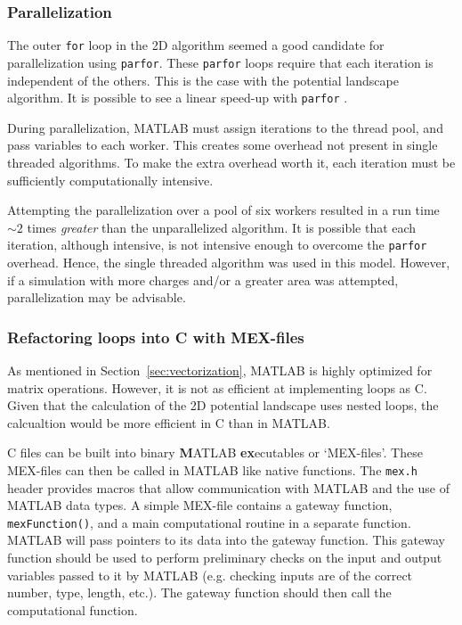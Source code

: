 \message{ !name(report.tex)}\documentclass[]{article}
\begin{document}
\subsubsection{Parallelization}
The outer \texttt{for} loop in the 2D algorithm seemed a good candidate for parallelization using \texttt{parfor}. These \texttt{parfor} loops require that each iteration is independent of the others. This is the case with the potential landscape algorithm. It is possible to see a linear speed-up with \texttt{parfor} \cite{}. 

During parallelization, MATLAB must assign iterations to the thread pool, and pass variables to each worker. This creates some overhead not present in single threaded algorithms. To make the extra overhead worth it, each iteration must be sufficiently computationally intensive. 

Attempting the parallelization over a pool of six workers resulted in a run time $\sim2$ times \emph{greater} than the unparallelized algorithm. It is possible that each iteration, although intensive, is not intensive enough to overcome the \texttt{parfor} overhead. Hence, the single threaded algorithm was used in this model. However, if a simulation with more charges and/or a greater area was attempted, parallelization may be advisable.

\subsubsection{Refactoring loops into C with MEX-files}
As mentioned in Section~\ref{sec:vectorization}, MATLAB is highly optimized for matrix operations. However, it is not as efficient at implementing loops as C. Given that the calculation of the 2D potential landscape uses nested loops, the calcualtion would be more efficient in C than in MATLAB.

C files can be built into binary \textbf{M}ATLAB \textbf{ex}ecutables or `MEX-files'. These MEX-files can then be called in MATLAB like native functions. The \texttt{mex.h} header provides macros that allow communication with MATLAB and the use of MATLAB data types. A simple MEX-file contains a gateway function, \texttt{mexFunction()}, and a main computational routine in a separate function. MATLAB will pass pointers to its data into the gateway function. This gateway function should be used to perform preliminary checks on the input and output variables passed to it by MATLAB (e.g. checking inputs are of the correct number, type, length, etc.). The gateway function should then call the computational function.
\end{document}
